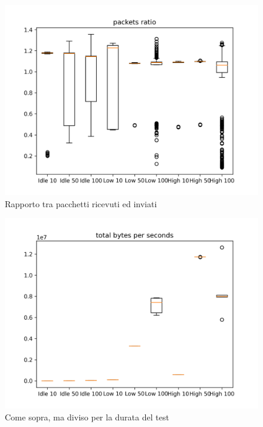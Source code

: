 \documentclass[12pt, a4paper]{article}
\begin{document}
\begin{figure}[H]
    \includegraphics[width=\linewidth, height=0.4\textheight, keepaspectratio]{graphs/packets ratio.png}
    \caption{Rapporto tra pacchetti ricevuti ed inviati}
    \label{fig:pr}
\end{figure}

\begin{figure}[H]
    \includegraphics[width=\linewidth, height=0.4\textheight, keepaspectratio]{graphs/total bytes per seconds.png}
    \caption{Come sopra, ma diviso per la durata del test}
    \label{fig:tbps}
\end{figure}
\end{document}
